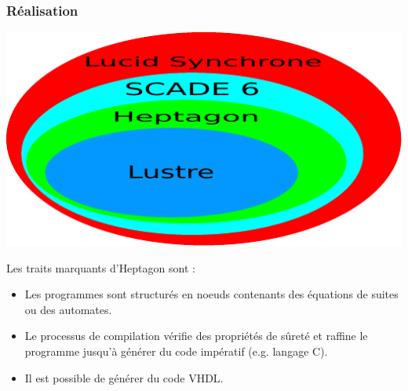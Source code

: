 \documentclass{beamer}
\newcommand{\heptagon}{{\sc Heptagon}}
\begin{document}
\begin{frame}
  \frametitle{Réalisation}

  \begin{center}
    \includegraphics[scale=0.65]{comparo.pdf}
  \end{center}

  Les traits marquants d'\heptagon{} sont :

  \begin{itemize}
  \item Les programmes sont structurés en noeuds contenants des équations de
    suites ou des automates.
  \item Le processus de compilation vérifie des propriétés de sûreté et raffine
    le programme jusqu'à générer du code impératif (e.g. langage C).
  \item<alert@2-> Il est possible de générer du code VHDL.
  \end{itemize}
\end{frame}
\end{document}
